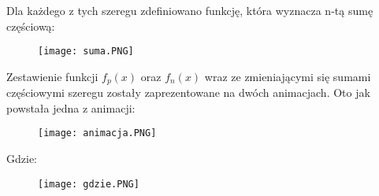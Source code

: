 \documentclass[12pt]{article}
\begin{document}
\newpage
Dla każdego z tych szeregu zdefiniowano funkcję, która wyznacza n-tą sumę częściową:

\bigskip

\begin{figure}[ht!]
\centering
\texttt{[image: suma.PNG]}
\label{fig:suma}
\end{figure}

\newpage
Zestawienie funkcji $f_p(x)$ oraz $f_n(x)$ wraz ze zmieniającymi się sumami częściowymi szeregu zostały zaprezentowane na dwóch animacjach. Oto jak powstała jedna z animacji:

\smallskip

\begin{figure}[ht!]
\centering
\texttt{[image: animacja.PNG]}
\label{fig:animacja}
\end{figure}

\bigskip
Gdzie:

\begin{figure}[ht!]
\centering
\texttt{[image: gdzie.PNG]}
\label{fig:gdzie}
\end{figure}
\end{document}

